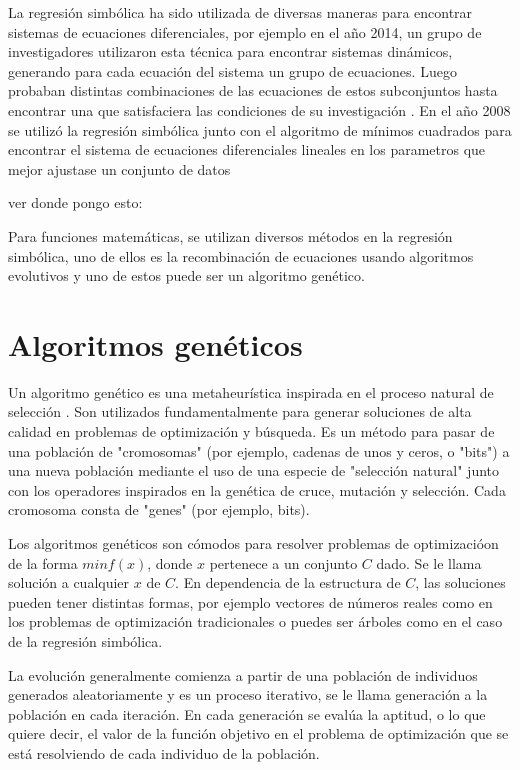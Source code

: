 La regresión simbólica ha sido utilizada de diversas maneras para encontrar sistemas de ecuaciones diferenciales, por ejemplo en el año 2014, un grupo de investigadores utilizaron esta técnica para encontrar sistemas dinámicos, generando para cada ecuación del sistema un grupo de ecuaciones. Luego probaban distintas combinaciones de las ecuaciones de estos subconjuntos hasta encontrar una que satisfaciera las condiciones de su investigación \cite{gaucel2014learning}. En el año 2008 se utilizó la regresión simbólica junto con el algoritmo de mínimos cuadrados para encontrar el sistema de ecuaciones diferenciales lineales en los parametros que mejor ajustase un conjunto de datos \cite{iba2008inference}

ver donde pongo esto:

Para funciones matemáticas, se utilizan diversos métodos en la regresión simbólica, uno de ellos es la recombinación de ecuaciones usando algoritmos evolutivos y uno de estos puede ser un algoritmo genético.

\section{Algoritmos genéticos}

Un algoritmo genético es una metaheurística inspirada en el proceso natural de selección \cite{mitchell1998introduction}. Son utilizados fundamentalmente para generar soluciones de alta calidad en problemas de optimización y búsqueda. Es un método para pasar de una población de "cromosomas" (por ejemplo, cadenas de unos y ceros, o "bits") a una nueva población mediante el uso de una especie de "selección natural" junto con los operadores inspirados en la genética de cruce, mutación y selección. Cada cromosoma consta de "genes" (por ejemplo, bits).

Los algoritmos genéticos son cómodos para resolver problemas de optimizacióon de la forma $min f(x)$, donde $x$ pertenece a un conjunto $C$ dado. Se le llama solución a cualquier $x$ de $C$. En dependencia de la estructura de $C$, las soluciones pueden tener distintas formas, por ejemplo vectores de números reales como en los problemas de optimización tradicionales o puedes ser árboles como en el caso de la regresión simbólica.

La evolución generalmente comienza a partir de una población de individuos generados aleatoriamente y es un proceso iterativo, se le llama generación a la población en cada iteración. En cada generación se evalúa la aptitud, o lo que quiere decir, el valor de la función objetivo en el problema de optimización que se está resolviendo de cada individuo de la población.

